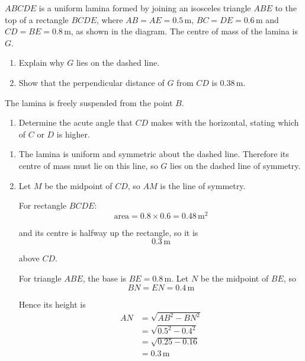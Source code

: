 \documentclass[leqno]{article}
\begin{document}
\begin{enumerate}[
  label=\textbf{\arabic*.},
  leftmargin=*,
  topsep=0pt,
  partopsep=0pt,
  parsep=0pt
]
$ABCDE$ is a uniform lamina formed by joining an isosceles triangle $ABE$ to the top of a rectangle $BCDE$, where $AB=AE=0.5\,\mathrm{m}$, $BC=DE=0.6\,\mathrm{m}$ and $CD=BE=0.8\,\mathrm{m}$, as shown in the diagram. The centre of mass of the lamina is $G$. \\
\begin{enumerate}[label=\textbf{(\alph*)}]
  \item Explain why $G$ lies on the dashed line.  \\
  \item Show that the perpendicular distance of $G$ from $CD$ is $0.38\,\mathrm{m}$.  \\
\end{enumerate}
The lamina is freely suspended from the point $B$. \\
\begin{enumerate}[label=\textbf{(\alph*)}, resume]
  \item Determine the acute angle that $CD$ makes with the horizontal, stating which of $C$ or $D$ is higher.  \\
\end{enumerate}

\vspace*{10pt}

\begin{djsSolution}
\begin{enumerate}[label=\textbf{(\alph*)}, start=1]
  \item The lamina is uniform and symmetric about the dashed line. Therefore its centre of mass must lie on this line, so \(G\) lies on the dashed line of symmetry.

  \item Let \(M\) be the midpoint of \(CD\), so \(AM\) is the line of symmetry.

For rectangle \(BCDE\):
\[
\text{area} = 0.8 \times 0.6 = 0.48\,\mathrm{m^2}
\]

and its centre is halfway up the rectangle, so it is
\[
0.3\,\mathrm{m}
\]

above \(CD\).

For triangle \(ABE\), the base is \(BE=0.8\,\mathrm{m}\). Let \(N\) be the midpoint of \(BE\), so
\[
BN=EN=0.4\,\mathrm{m}
\]

Hence its height is
\begin{align*}
AN &= \sqrt{AB^2-BN^2} \\
   &= \sqrt{0.5^2-0.4^2} \\
   &= \sqrt{0.25-0.16} \\
   &= 0.3\,\mathrm{m}
\end{align*}


\end{enumerate}
\end{djsSolution}
\end{enumerate}
\end{document}
